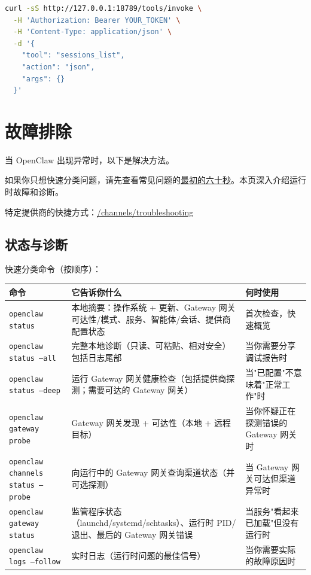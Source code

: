 \begin{lstlisting}[language=bash]
curl -sS http://127.0.0.1:18789/tools/invoke \
  -H 'Authorization: Bearer YOUR_TOKEN' \
  -H 'Content-Type: application/json' \
  -d '{
    "tool": "sessions_list",
    "action": "json",
    "args": {}
  }'
\end{lstlisting}



\clearpage

\section{故障排除}


当 OpenClaw 出现异常时，以下是解决方法。

如果你只想快速分类问题，请先查看常见问题的\href{/help/faq\#first-60-seconds-if-somethings-broken}{最初的六十秒}。本页深入介绍运行时故障和诊断。

特定提供商的快捷方式：\href{/channels/troubleshooting}{/channels/troubleshooting}

\subsection{状态与诊断}


快速分类命令（按顺序）：


\begin{table}[h]
\centering
\small
\begin{tabular}{|l|l|l|}
\hline
命令 & 它告诉你什么 & 何时使用 \\
\hline
\texttt{openclaw status} & 本地摘要：操作系统 + 更新、Gateway 网关可达性/模式、服务、智能体/会话、提供商配置状态 & 首次检查，快速概览 \\
\hline
\texttt{openclaw status --all} & 完整本地诊断（只读、可粘贴、相对安全）包括日志尾部 & 当你需要分享调试报告时 \\
\hline
\texttt{openclaw status --deep} & 运行 Gateway 网关健康检查（包括提供商探测；需要可达的 Gateway 网关） & 当"已配置"不意味着"正常工作"时 \\
\hline
\texttt{openclaw gateway probe} & Gateway 网关发现 + 可达性（本地 + 远程目标） & 当你怀疑正在探测错误的 Gateway 网关时 \\
\hline
\texttt{openclaw channels status --probe} & 向运行中的 Gateway 网关查询渠道状态（并可选探测） & 当 Gateway 网关可达但渠道异常时 \\
\hline
\texttt{openclaw gateway status} & 监管程序状态（launchd/systemd/schtasks）、运行时 PID/退出、最后的 Gateway 网关错误 & 当服务"看起来已加载"但没有运行时 \\
\hline
\texttt{openclaw logs --follow} & 实时日志（运行时问题的最佳信号） & 当你需要实际的故障原因时 \\
\hline
\end{tabular}
\end{table}



